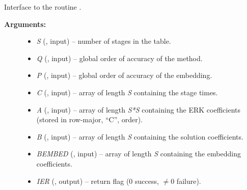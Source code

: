 \documentclass[letterpaper,10pt,english]{sphinxmanual}
\begin{document}
\begin{fulllineitems}
\label{f_interface/Usage:f/_/FARKSETERKTABLE}
Interface to the routine {\hyperref[c_interface/User_callable:ARKodeSetERKTable]{}}.
\begin{description}
\item[{\textbf{Arguments:}}] \leavevmode\begin{itemize}
\item {} 
\emph{S} (, input) -- number of stages in the table.

\item {} 
\emph{Q} (, input) -- global order of accuracy of the method.

\item {} 
\emph{P} (, input) -- global order of accuracy of the embedding.

\item {} 
\emph{C} (, input) -- array of length \emph{S} containing the stage times.

\item {} 
\emph{A} (, input) -- array of length \emph{S*S} containing the ERK coefficients
(stored in row-major, ``C'', order).

\item {} 
\emph{B} (, input) -- array of length \emph{S} containing the solution coefficients.

\item {} 
\emph{BEMBED} (, input) -- array of length \emph{S} containing the embedding
coefficients.

\item {} 
\emph{IER} (, output) -- return flag (0 success, $\ne 0$ failure).

\end{itemize}

\end{description}

\end{fulllineitems}

\end{document}
